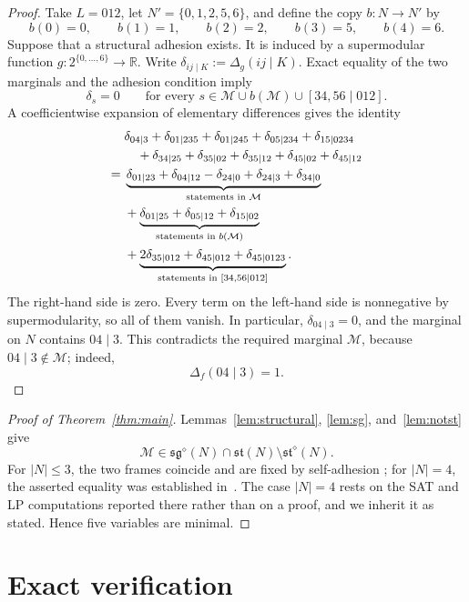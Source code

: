 \documentclass[11pt]{amsart}
\newcommand{\sg}{\mathfrak{sg}}
\newcommand{\st}{\mathfrak{st}}
\newcommand{\M}{\mathcal{M}}
\begin{document}
\begin{proof}
Take $L=012$, let $N'=\{0,1,2,5,6\}$, and define the copy
$b\colon N\to N'$ by
\[
  b(0)=0,\qquad b(1)=1,\qquad b(2)=2,\qquad b(3)=5,\qquad b(4)=6.
\]
Suppose that a structural adhesion exists. It is induced by a
supermodular function $g\colon2^{\{0,\ldots,6\}}\to\mathbb R$.
Write $\delta_{ij\mid K}:=\Delta_g(ij\mid K)$. Exact equality of the two
marginals and the adhesion condition imply
\[
  \delta_s=0
  \qquad
  \text{for every }s\in
  \M\cup b(\M)\cup[34,56\mid012].
\]
A coefficientwise expansion of elementary differences gives the identity
\begin{align}
&\delta_{04\mid3}
 +\delta_{01\mid235}
 +\delta_{01\mid245}
 +\delta_{05\mid234}
 +\delta_{15\mid0234}\notag\\
&\quad
 +\delta_{34\mid25}
 +\delta_{35\mid02}
 +\delta_{35\mid12}
 +\delta_{45\mid02}
 +\delta_{45\mid12}
\label{eq:certificate}\\
={}&
 \underbrace{
 \delta_{01\mid23}
 +\delta_{04\mid12}
 -\delta_{24\mid0}
 +\delta_{24\mid3}
 +\delta_{34\mid0}}_{\text{statements in }\M}
 \notag\\
&+
 \underbrace{
 \delta_{01\mid25}
 +\delta_{05\mid12}
 +\delta_{15\mid02}}_{\text{statements in }b(\M)}
 \notag\\
&+
 \underbrace{
 2\delta_{35\mid012}
 +\delta_{45\mid012}
 +\delta_{45\mid0123}}_{\text{statements in }[34,56\mid012]}.
 \notag
\end{align}
The right-hand side is zero. Every term on the left-hand side is
nonnegative by supermodularity, so all of them vanish. In particular,
$\delta_{04\mid3}=0$, and the marginal on $N$ contains $04\mid3$.
This contradicts the required marginal $\M$, because $04\mid3\notin\M$;
indeed,
\[
  \Delta_f(04\mid3)=1.
\]
\end{proof}

\begin{proof}[Proof of Theorem~\ref{thm:main}]
Lemmas~\ref{lem:structural}, \ref{lem:sg}, and~\ref{lem:notst} give
\[
  \M\in\sg^{\diamond}(N)\cap\st(N)
  \setminus\st^{\diamond}(N).
\]
For $|N|\leq3$, the two frames coincide and are fixed by self-adhesion
\cite[Corollary~4.17]{BBS}; for $|N|=4$, the asserted equality was
established in~\cite[Section~7.4]{BBS}. The case $|N|=4$ rests on the
SAT and LP computations reported there rather than on a proof, and we
inherit it as stated. Hence five variables are minimal.
\end{proof}

\section*{Exact verification}
\end{document}
